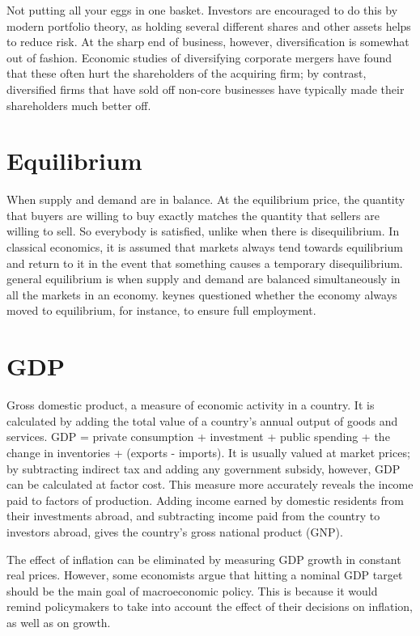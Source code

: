 \documentclass[11pt,]{book}
\theoremstyle{definition}
\theoremstyle{definition}
\theoremstyle{definition}
\theoremstyle{remark}
\begin{document}
Not putting all your eggs in one basket. Investors are encouraged to do
this by modern portfolio theory, as holding several different shares and
other assets helps to reduce risk. At the sharp end of business,
however, diversification is somewhat out of fashion. Economic studies of
diversifying corporate mergers have found that these often hurt the
shareholders of the acquiring firm; by contrast, diversified firms that
have sold off non-core businesses have typically made their shareholders
much better off.

\section{Equilibrium}\label{equilibrium}

When supply and demand are in balance. At the equilibrium price, the
quantity that buyers are willing to buy exactly matches the quantity
that sellers are willing to sell. So everybody is satisfied, unlike when
there is disequilibrium. In classical economics, it is assumed that
markets always tend towards equilibrium and return to it in the event
that something causes a temporary disequilibrium. general equilibrium is
when supply and demand are balanced simultaneously in all the markets in
an economy. keynes questioned whether the economy always moved to
equilibrium, for instance, to ensure full employment.

\section{GDP}\label{gdp}

Gross domestic product, a measure of economic activity in a country. It
is calculated by adding the total value of a country's annual output of
goods and services. GDP = private consumption + investment + public
spending + the change in inventories + (exports - imports). It is
usually valued at market prices; by subtracting indirect tax and adding
any government subsidy, however, GDP can be calculated at factor cost.
This measure more accurately reveals the income paid to factors of
production. Adding income earned by domestic residents from their
investments abroad, and subtracting income paid from the country to
investors abroad, gives the country's gross national product (GNP).

The effect of inflation can be eliminated by measuring GDP growth in
constant real prices. However, some economists argue that hitting a
nominal GDP target should be the main goal of macroeconomic policy. This
is because it would remind policymakers to take into account the effect
of their decisions on inflation, as well as on growth.
\end{document}
